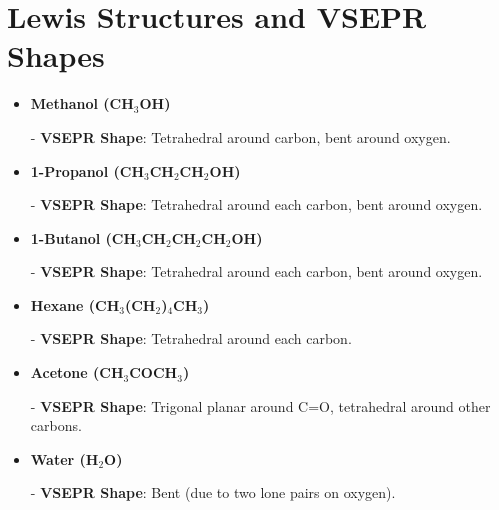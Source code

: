 \documentclass{article}
\begin{document}
\section*{Lewis Structures and VSEPR Shapes}
\begin{itemize}
    \item \textbf{Methanol (CH$_3$OH)}
    \begin{center}
    \end{center}
    - \textbf{VSEPR Shape}: Tetrahedral around carbon, bent around oxygen.

    \item \textbf{1-Propanol (CH$_3$CH$_2$CH$_2$OH)}
    \begin{center}
    \end{center}
    - \textbf{VSEPR Shape}: Tetrahedral around each carbon, bent around oxygen.

    \item \textbf{1-Butanol (CH$_3$CH$_2$CH$_2$CH$_2$OH)}
    \begin{center}
    \end{center}
    - \textbf{VSEPR Shape}: Tetrahedral around each carbon, bent around oxygen.

    \item \textbf{Hexane (CH$_3$(CH$_2$)$_4$CH$_3$)}
    \begin{center}
    \end{center}
    - \textbf{VSEPR Shape}: Tetrahedral around each carbon.

    \item \textbf{Acetone (CH$_3$COCH$_3$)}
    \begin{center}
    \end{center}
    - \textbf{VSEPR Shape}: Trigonal planar around C=O, tetrahedral around other carbons.

    \item \textbf{Water (H$_2$O)}
    \begin{center}
    \end{center}
    - \textbf{VSEPR Shape}: Bent (due to two lone pairs on oxygen).
\end{itemize}
\end{document}
